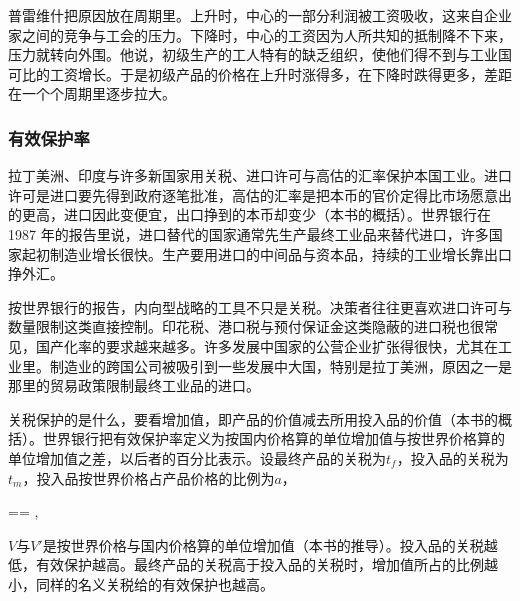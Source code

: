普雷维什把原因放在周期里\cite{prebisch1950}。上升时，中心的一部分利润被工资吸收，这来自企业家之间的竞争与工会的压力。下降时，中心的工资因为人所共知的抵制降不下来，压力就转向外围\cite{prebisch1950}。他说，初级生产的工人特有的缺乏组织，使他们得不到与工业国可比的工资增长\cite{prebisch1950}。于是初级产品的价格在上升时涨得多，在下降时跌得更多，差距在一个个周期里逐步拉大\cite{prebisch1950}。


\subsubsection{有效保护率}

拉丁美洲、印度与许多新国家用关税、进口许可与高估的汇率保护本国工业。进口许可是进口要先得到政府逐笔批准，高估的汇率是把本币的官价定得比市场愿意出的更高，进口因此变便宜，出口挣到的本币却变少（本书的概括）。世界银行在 1987 年的报告里说，进口替代的国家通常先生产最终工业品来替代进口，许多国家起初制造业增长很快\cite{wdr1987}。生产要用进口的中间品与资本品，持续的工业增长靠出口挣外汇\cite{wdr1987}。

按世界银行的报告，内向型战略的工具不只是关税\cite{wdr1987}。决策者往往更喜欢进口许可与数量限制这类直接控制。印花税、港口税与预付保证金这类隐蔽的进口税也很常见，国产化率的要求越来越多\cite{wdr1987}。许多发展中国家的公营企业扩张得很快，尤其在工业里\cite{wdr1987}。制造业的跨国公司被吸引到一些发展中大国，特别是拉丁美洲，原因之一是那里的贸易政策限制最终工业品的进口\cite{wdr1987}。

关税保护的是什么，要看增加值，即产品的价值减去所用投入品的价值（本书的概括）。世界银行把有效保护率定义为按国内价格算的单位增加值与按世界价格算的单位增加值之差，以后者的百分比表示\cite{wdr1987}。设最终产品的关税为$t_f$，投入品的关税为$t_m$，投入品按世界价格占产品价格的比例为$a$，
\begin{keyeq}
== ,\label{eq:development-erp}
\end{keyeq}
$V$与$V'$是按世界价格与国内价格算的单位增加值（本书的推导）。投入品的关税越低，有效保护越高。最终产品的关税高于投入品的关税时，增加值所占的比例越小，同样的名义关税给的有效保护也越高。

